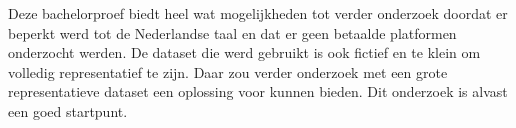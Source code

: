 Deze bachelorproef biedt heel wat mogelijkheden tot verder onderzoek doordat er beperkt werd tot de Nederlandse taal en dat er geen betaalde platformen onderzocht werden. De dataset die werd gebruikt is ook fictief en te klein om volledig representatief te zijn. Daar zou verder onderzoek met een grote representatieve dataset een oplossing voor kunnen bieden. Dit onderzoek is alvast een goed startpunt.





























